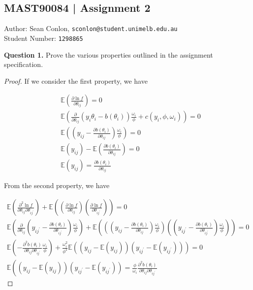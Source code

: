 \documentclass{article}
\newcommand\questionbox[1]{%
  \begin{Qbox}#1\end{Qbox}}
\begin{document}
\subsection*{MAST90084 | Assignment 2}
Author: Sean Conlon, \texttt{sconlon@student.unimelb.edu.au} \\
Student Number: \texttt{1298865}

\vspace{10pt}
\questionbox{\textbf{Question 1.} Prove the various properties outlined in the assignment specification. 
}
\begin{proof}
    If we consider the first property, we have

$$
\begin{aligned}
& \mathbb{E}\left(\frac{\partial \ln f}{\partial \theta_{i j}}\right)=0 \\
& \mathbb{E}\left(\frac{\partial}{\partial \theta_{i j}}\left(y_{i} \theta_{i}-b\left(\theta_{i}\right)\right) \frac{\omega_{i}}{\phi}+c\left(y_{i}, \phi, \omega_{i}\right)\right)=0 \\
& \mathbb{E}\left(\left(y_{i j}-\frac{\partial b\left(\theta_{i}\right)}{\partial \theta_{i j}}\right) \frac{\omega_{i}}{\phi}\right)=0 \\
& \mathbb{E}\left(y_{i j}\right)-\mathbb{E}\left(\frac{\partial b\left(\theta_{i}\right)}{\partial \theta_{i j}}\right)=0 \\
& \mathbb{E}\left(y_{i j}\right)=\frac{\partial b\left(\theta_{i}\right)}{\partial \theta_{i j}}
\end{aligned}
$$

From the second property, we have

$$
\begin{array}{r}
\mathbb{E}\left(\frac{\partial^{2} \ln f}{\partial \theta_{i j} \partial \theta_{i j^{\prime}}}\right)+\mathbb{E}\left(\left(\frac{\partial \ln f}{\partial \theta_{i j}}\right)\left(\frac{\partial \ln f}{\partial \theta_{i j^{\prime}}}\right)\right)=0 \\
\mathbb{E}\left(\frac{\partial}{\partial \theta_{i j}}\left(y_{i j^{\prime}}-\frac{\partial b\left(\theta_{i}\right)}{\partial \theta_{i j^{\prime}}}\right) \frac{\omega_{i}}{\phi}\right)+\mathbb{E}\left(\left(\left(y_{i j}-\frac{\partial b\left(\theta_{i}\right)}{\partial \theta_{i j}}\right) \frac{\omega_{i}}{\phi}\right)\left(\left(y_{i j^{\prime}}-\frac{\partial b\left(\theta_{i}\right)}{\partial \theta_{i j^{\prime}}}\right) \frac{\omega_{i}}{\phi}\right)\right)=0 \\
\mathbb{E}\left(-\frac{\partial^{2} b\left(\theta_{i}\right)}{\partial \theta_{i j} \partial \theta_{i j^{\prime}}} \frac{\omega_{i}}{\phi}\right)+\frac{\omega_{i}^{2}}{\phi^{2}} \mathbb{E}\left(\left(y_{i j}-\mathbb{E}\left(y_{i j}\right)\right)\left(y_{i j^{\prime}}-\mathbb{E}\left(y_{i j^{\prime}}\right)\right)\right)=0 \\
\mathbb{E}\left(\left(y_{i j}-\mathbb{E}\left(y_{i j}\right)\right)\left(y_{i j^{\prime}}-\mathbb{E}\left(y_{i j^{\prime}}\right)\right)=\frac{\phi}{\omega_{i}} \frac{\partial^{2} b\left(\theta_{i}\right)}{\partial \theta_{i j} \partial \theta_{i j^{\prime}}}\right.
\end{array}
$$


\end{proof}
\end{document}
